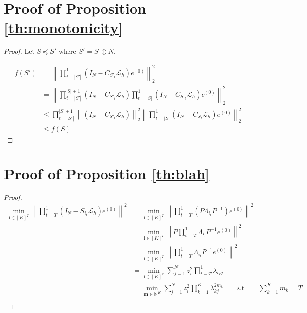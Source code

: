 \documentclass[12pt]{article}
\begin{document}
\section{Proof of Proposition \ref{th:monotonicity}}

\begin{proof}

Let $S \preceq S'$ where $S' = S \ \oplus N$.

\begin{align*}
    f(S') &= \left \|\prod_{t = |S'|}^1\left(I_N - C_{S'_t}\mathcal{L}_h\right) e^{(0)}\right\|^2_2 \\
    &= \left \|\prod_{t = |S'|}^{|S| + 1}\left(I_N - C_{S'_t}\mathcal{L}_h\right)\prod_{t = |S|}^1\left(I_N - C_{S'_t}\mathcal{L}_h\right) e^{(0)}\right\|^2_2 \\
    &\leq \prod_{t = |S'|}^{|S| + 1}\left \|\left(I_N - C_{S'_t}\mathcal{L}_h\right) \right\|^2_2 \left\|\prod_{t = |S|}^1\left(I_N - C_{S_t}\mathcal{L}_h\right) e^{(0)}\right\|^2_2 \\
    &\leq f(S)
\end{align*}

\end{proof}

\section{Proof of Proposition \ref{th:blah}}



\begin{proof}

\begin{align*}
    \min_{\mathbf{i} \in [K]^T} \left\|\prod_{t = T}^1\left(I_N - S_{i_t} \mathcal{L}_{h}\right)  e^{(0)} \right\|^2 &= \min_{\mathbf{i} \in [K]^T} \left\|\prod_{t = T}^1\left(P\Lambda_{i_t}P^{-1}\right)  e^{(0)} \right\|^2 \\
    &= \min_{\mathbf{i} \in [K]^T} \left\|P\prod_{t = T}^1\Lambda_{i_t}P^{-1}  e^{(0)} \right\|^2 \\
    &= \min_{\mathbf{i} \in [K]^T} \left\|\prod_{t = T}^1\Lambda_{i_t}P^{-1}  e^{(0)} \right\|^2\\
    &= \min_{\mathbf{i} \in [K]^T} \sum_{j = 1}^N z_i^2 \prod_{t = T}^1 \lambda_{i_Tj} \\
    &= \min_{\mathbf{m} \in \mathbb{N}^K} \sum_{j = 1}^N z_i^2 \prod_{k = 1}^K \lambda_{kj}^{2m_k} \qquad\mathrm{s.t}\qquad \sum_{k=1}^{K} m_k = T \\
\end{align*}

\end{proof}
\end{document}
